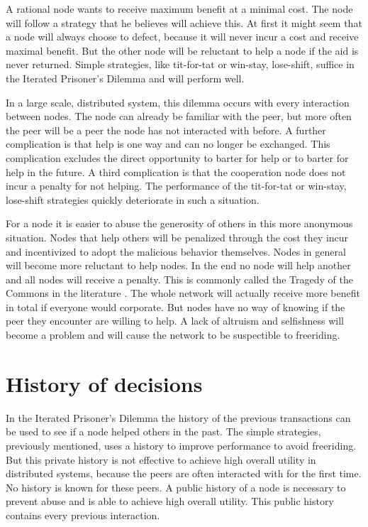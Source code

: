 A rational node wants to receive maximum benefit at a minimal cost.
The node will follow a strategy that he believes will achieve this.
At first it might seem that a node will always choose to defect,
because it will never incur a cost and receive maximal benefit.
But the other node will be reluctant to help a node if the aid is never returned.
Simple strategies, like tit-for-tat or win-stay, lose-shift, suffice in the Iterated Prisoner's Dilemma
and will perform well\cite{Nowak-Cooperation}.

In a large scale, distributed system, this dilemma occurs with every interaction between nodes.
The node can already be familiar with the peer,
but more often the peer will be a peer the node has not interacted with before.
A further complication is that help is one way and can no longer be exchanged.
This complication excludes the direct opportunity to barter for help 
or to barter for help in the future\cite{Lai-Incentives}.
A third complication is that the cooperation node does not incur a penalty for not helping.
The performance of the tit-for-tat or win-stay, lose-shift strategies
quickly deteriorate in such a situation.

For a node it is easier to abuse the generosity of others in this more anonymous situation.
Nodes that help others will be penalized through the cost they incur
and incentivized to adopt the malicious behavior themselves.
Nodes in general will become more reluctant to help nodes\cite{Nowak-PrisonerDilemma}.
In the end no node will help another and all nodes will receive a penalty.
This is commonly called the Tragedy of the Commons in the literature \cite{hardin-tragedy}.
The whole network will actually receive more benefit in total if everyone would corporate.
But nodes have no way of knowing if the peer they encounter are willing to help.
A lack of altruism and selfishness will become a problem 
and will cause the network to be suspectible to freeriding.

\section{History of decisions}

In the Iterated Prisoner's Dilemma the history of the previous transactions can be used 
to see if a node helped others in the past.
The simple strategies, previously mentioned, uses a history to improve performance
to avoid freeriding.
But this private history is not effective to achieve high overall utility in distributed systems,
because the peers are often interacted with for the first time.
No history is known for these peers.
A public history of a node is necessary to prevent abuse
and is able to achieve high overall utility\cite{Lai-Incentives}.
This public history contains every previous interaction.

